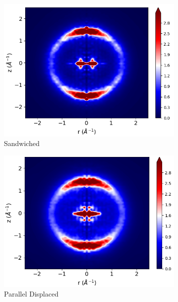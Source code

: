 \documentclass{article}
\begin{document}
\begin{figure}[h]
        \begin{subfigure}{0.33\textwidth}
                \centering
                \includegraphics[width=\textwidth]{rzplot_layered_300K.png}
                \caption{Sandwiched}\label{fig:xrd_layered}
        \end{subfigure}
        \begin{subfigure}{0.33\textwidth}
                \centering
                \includegraphics[width=\textwidth]{rzplot_offset_300K.png}
                \caption{Parallel Displaced}\label{fig:xrd_offset}
        \end{subfigure}
	\begin{subfigure}{0.33\textwidth}

\end{subfigure}
\end{figure}
\end{document}
